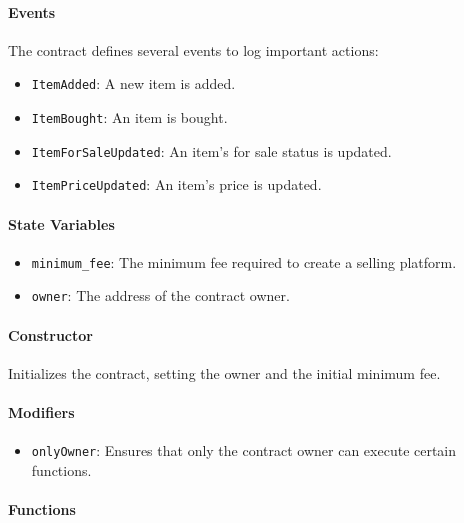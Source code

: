\documentclass[runningheads]{llncs}
\begin{document}
\paragraph{Events}

The contract defines several events to log important actions:
\begin{itemize}
    \item \texttt{ItemAdded}: A new item is added.
    \item \texttt{ItemBought}: An item is bought.
    \item \texttt{ItemForSaleUpdated}: An item's for sale status is updated.
    \item \texttt{ItemPriceUpdated}: An item's price is updated.
\end{itemize}

\paragraph{State Variables}

\begin{itemize}
    \item \texttt{minimum\_fee}: The minimum fee required to create a selling platform.
    \item \texttt{owner}: The address of the contract owner.
\end{itemize}

\paragraph{Constructor}

Initializes the contract, setting the owner and the initial minimum fee.

\paragraph{Modifiers}

\begin{itemize}
    \item \texttt{onlyOwner}: Ensures that only the contract owner can execute certain functions.
\end{itemize}

\paragraph{Functions}
\end{document}
